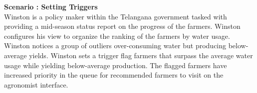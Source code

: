 \begin{flushleft}
\textbf{Scenario : Setting Triggers}\\\smallskip
Winston is a policy maker within the Telangana government tasked with providing a mid-season status report on the progress of the farmers. Winston configures his view to organize the ranking of the farmers by water usage. Winston notices a group of outliers over-consuming water but producing below-average yields. Winston sets a trigger flag farmers that surpass the average water usage while yielding below-average production. The flagged farmers have increased priority in the queue for recommended farmers to visit on the agronomist interface. 
\end{flushleft}
